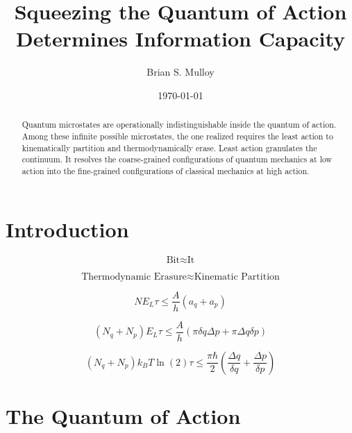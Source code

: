 \documentclass[%
  aps, reprint, prl, amsmath,amssymb
]{revtex4-2}
\begin{document}
\title{Squeezing the Quantum of Action Determines Information Capacity}

\begin{abstract}
Quantum microstates are operationally indistinguishable inside the quantum of action. Among these infinite possible microstates, the one realized requires the least action to kinematically partition and thermodynamically erase. Least action granulates the continuum. It resolves the coarse-grained configurations of quantum mechanics at low action into the fine-grained configurations of classical mechanics at high action.
\end{abstract}

\author{Brian S. Mulloy}

\date{\today}

\maketitle

\section{Introduction}
\begin{equation}
\label{eq:MainIdeaTextWheeler}
\text{Bit} \approx \text{It}
\end{equation}

\begin{equation}
\label{eq:MainIdeaText}
\text{Thermodynamic Erasure} \approx \text{Kinematic Partition}
\end{equation}

\begin{equation}
\label{eq:Hero}
N E_L \tau \le \frac{A}{h}(a_q + a_p)
\end{equation}

\begin{equation}
\label{eq:2DHero}
(N_q + N_p) E_L \tau \le \frac{A}{h}(\pi \delta q \Delta p + \pi \Delta q \delta p)
\end{equation}

\begin{equation}
\label{eq:FullyExpandedHero}
(N_q + N_p) k_B T \ln(2) \tau \le \frac{\pi \hbar}{2} \left( \frac{\Delta q}{\delta q} + \frac{\Delta p}{\delta p} \right)
\end{equation}

\section{The Quantum of Action}
\end{document}
